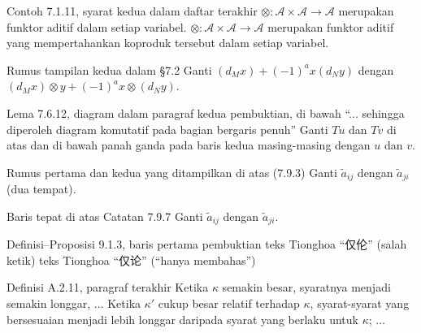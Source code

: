 \documentclass{AJerrata}
\begin{document}
\begin{Errata}
		\item[Contoh 7.1.11, syarat kedua dalam daftar terakhir]
		\Orig $\otimes: \mathcal{A} \times \mathcal{A} \to \mathcal{A}$ merupakan funktor aditif dalam setiap variabel.
		\Corr $\otimes: \mathcal{A} \times \mathcal{A} \to \mathcal{A}$ merupakan funktor aditif yang mempertahankan koproduk tersebut dalam setiap variabel.
		
		\item[Rumus tampilan kedua dalam \S 7.2]
		Ganti $(d_M x) + (-1)^a x (d_N y)$ dengan $(d_M x) \otimes y + (-1)^a x \otimes (d_N y)$.
		
		\item[Lema 7.6.12, diagram dalam paragraf kedua pembuktian, di bawah ``... sehingga diperoleh diagram komutatif pada bagian bergaris penuh'']
		Ganti $Tu$ dan $Tv$ di atas dan di bawah panah ganda pada baris kedua masing-masing dengan $u$ dan $v$.
		
		\item[Rumus pertama dan kedua yang ditampilkan di atas (7.9.3)]
		Ganti $\tilde{a}_{ij}$ dengan $\tilde{a}_{ji}$ (dua tempat).
		
		\item[Baris tepat di atas Catatan 7.9.7]
		Ganti $\tilde{a}_{ij}$ dengan $\tilde{a}_{ji}$.
		
		\item[Definisi--Proposisi 9.1.3, baris pertama pembuktian]
		\Orig teks Tionghoa ``仅伦'' (salah ketik)
		\Corr teks Tionghoa ``仅论'' (``hanya membahas'')
		
		\item[Definisi A.2.11, paragraf terakhir]
		\Orig Ketika $\kappa$ semakin besar, syaratnya menjadi semakin longgar, ...
		\Corr Ketika $\kappa'$ cukup besar relatif terhadap $\kappa$, syarat-syarat yang bersesuaian menjadi lebih longgar daripada syarat yang berlaku untuk $\kappa$; ...
	\end{Errata}
\end{document}
